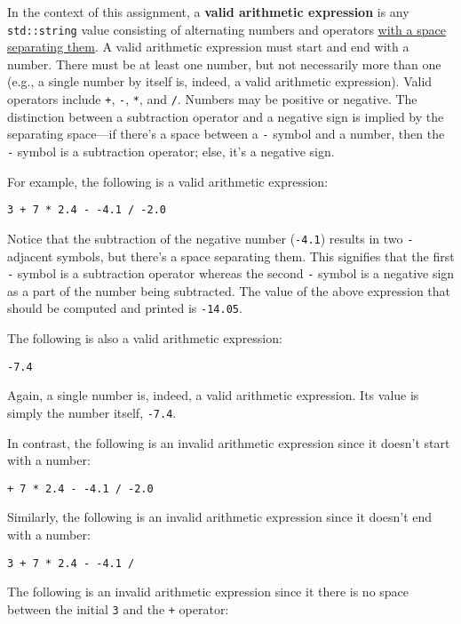 \documentclass{article}
\begin{document}
In the context of this assignment, a \textbf{valid arithmetic expression} is any \texttt{std::string} value consisting of alternating numbers and operators \ul{with a space separating them}. A valid arithmetic expression must start and end with a number. There must be at least one number, but not necessarily more than one (e.g., a single number by itself is, indeed, a valid arithmetic expression). Valid operators include \texttt{+}, \texttt{-}, \texttt{*}, and \texttt{/}. Numbers may be positive or negative. The distinction between a subtraction operator and a negative sign is implied by the separating space---if there's a space between a \texttt{-} symbol and a number, then the \texttt{-} symbol is a subtraction operator; else, it's a negative sign.

For example, the following is a valid arithmetic expression:

\begin{verbatim}
3 + 7 * 2.4 - -4.1 / -2.0
\end{verbatim}

Notice that the subtraction of the negative number (\texttt{-4.1}) results in two \texttt{-} adjacent symbols, but there's a space separating them. This signifies that the first \texttt{-} symbol is a subtraction operator whereas the second \texttt{-} symbol is a negative sign as a part of the number being subtracted. The value of the above expression that should be computed and printed is \texttt{-14.05}.

The following is also a valid arithmetic expression:

\begin{verbatim}
-7.4
\end{verbatim}

Again, a single number is, indeed, a valid arithmetic expression. Its value is simply the number itself, \texttt{-7.4}.

In contrast, the following is an invalid arithmetic expression since it doesn't start with a number:

\begin{verbatim}
+ 7 * 2.4 - -4.1 / -2.0
\end{verbatim}

Similarly, the following is an invalid arithmetic expression since it doesn't end with a number:

\begin{verbatim}
3 + 7 * 2.4 - -4.1 /
\end{verbatim}

The following is an invalid arithmetic expression since it there is no space between the initial \texttt{3} and the \texttt{+} operator:
\end{document}
